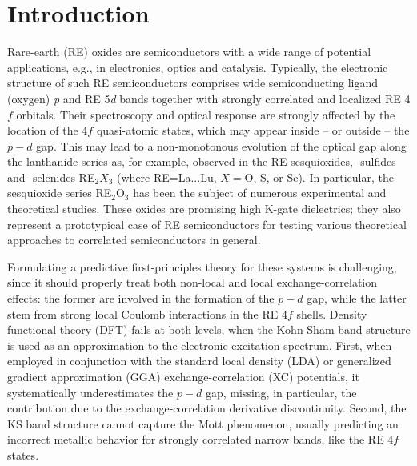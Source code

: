 \documentclass[aps,prb,twocolumn,amsmath,amssymb]{revtex4}
\begin{document}
\section{Introduction}

Rare-earth (RE) oxides are semiconductors with a wide range of potential applications, e.g., in electronics, optics and catalysis\cite{Gasgnier1989,Trovarelli1999,Paivasaari2005,Leskela2006,Chiu2012,Goh2017}.  
Typically, the electronic structure of such RE semiconductors comprises wide semiconducting ligand (oxygen) \textit{p} and RE 5\textit{d} bands together with  strongly correlated and localized RE 4$f$ orbitals. Their spectroscopy and optical response  are strongly affected by the location of the 4$f$ quasi-atomic states, which may appear inside -- or outside -- the $p-d$ gap. This may lead to a non-monotonous evolution of the optical gap along the lanthanide  series as, for example, observed\cite{Golubkov1995,prokofiev1996} in the  RE sesquioxides, -sulfides and -selenides RE$_2X_3$ (where RE=La...Lu, $X=$O, S, or Se). In particular, the sesquioxide series RE$_2$O$_3$ has been the subject of numerous experimental and theoretical studies. These oxides are promising high K-gate dielectrics\cite{Leskela2006,Chiu2012,Goh2017}; they also represent a prototypical case of RE semiconductors for testing various theoretical approaches to correlated  semiconductors in general.\cite{Skorodumova2001,Petit2005,Hay2006,Loschen2007,Pourovskii2007,Tomczak2007,Jacob2008,Jiang2009,Jiang2012,Amadon2012,Gillen2013,Jiang2018,El-Kelany2018}



Formulating a predictive first-principles theory for these systems is challenging, since it should properly treat both non-local and local exchange-correlation effects: the former are involved in the formation of the $p-d$ gap, while the latter stem from strong local Coulomb interactions in the RE 4$f$ shells. 
Density functional theory (DFT)\cite{Kohn1965} fails at both levels, when the Kohn-Sham band structure is used as an approximation to the electronic excitation spectrum. First, when employed in conjunction with  the standard local density (LDA) or generalized gradient approximation (GGA) exchange-correlation (XC) potentials, it systematically underestimates the $p-d$ gap\cite{Yang2012}, missing, in particular, the contribution due to the exchange-correlation derivative discontinuity\cite{Perdew1983,Sham1983}. 
Second, the KS band structure cannot capture the Mott phenomenon, usually predicting an incorrect metallic behavior for strongly correlated narrow bands, like the RE 4$f$ states. 
\end{document}
